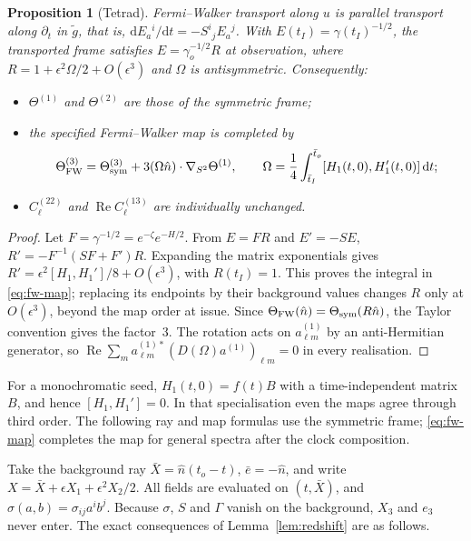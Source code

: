 \documentclass[11pt]{article}
\newtheorem{proposition}[theorem]{Proposition}
\theoremstyle{definition}
\theoremstyle{remark}
\newcommand{\eps}{\epsilon}
\newcommand{\nh}{\hat n}
\newcommand{\dd}{\mathrm{d}}
\begin{document}
\begin{proposition}[Tetrad]\label{prop:frame}
Fermi--Walker transport along $u$ is parallel transport along $\partial_t$ in $\tilde g$, that
is, $\dd E_a{}^i/\dd t=-S^i{}_jE_a{}^j$. With $E(t_I)=\gamma(t_I)^{-1/2}$, the transported frame
satisfies $E=\gamma_o^{-1/2}R$ at observation, where $R=1+\eps^2\Omega/2+O(\eps^3)$ and $\Omega$
is antisymmetric. Consequently:
\begin{itemize}
\item $\Theta^{(1)}$ and $\Theta^{(2)}$ are those of the symmetric frame;
\item the specified Fermi--Walker map is completed by
  \begin{equation}\label{eq:fw-map}
  \Theta_{\rm FW}^{(3)}=\Theta_{\rm sym}^{(3)}
  +3(\Omega\nh)\cdot\nabla_{S^2}\Theta^{(1)},\qquad
  \Omega=\frac14\int_{\bar t_I}^{\bar t_o}[H_1(t,0),H_1'(t,0)]\,\dd t;
  \end{equation}
\item $C_\ell^{(22)}$ and $\operatorname{Re}C_\ell^{(13)}$ are individually unchanged.
\end{itemize}
\end{proposition}
\begin{proof}
Let $F=\gamma^{-1/2}=e^{-\zeta}e^{-H/2}$. From $E=FR$ and $E'=-SE$,
$R'=-F^{-1}(SF+F')R$. Expanding the matrix exponentials gives
$R'=\eps^2[H_1,H_1']/8+O(\eps^3)$, with $R(t_I)=1$. This proves the integral in
\eqref{eq:fw-map}; replacing its endpoints by their background values changes $R$ only at
$O(\eps^3)$, beyond the map order at issue. Since
$\Theta_{\rm FW}(\nh)=\Theta_{\rm sym}(R\nh)$, the Taylor convention gives the factor~3.
The rotation acts on $a^{(1)}_{\ell m}$ by an anti-Hermitian generator, so
$\operatorname{Re}\sum_ma^{(1)*}_{\ell m}(D(\Omega)a^{(1)})_{\ell m}=0$ in every realisation.
\end{proof}

For a monochromatic seed, $H_1(t,0)=f(t)B$ with a time-independent matrix $B$, and hence
$[H_1,H_1']=0$. In that specialisation even the maps agree through third order.
The following ray and map formulas use the symmetric frame; \eqref{eq:fw-map} completes the
map for general spectra after the clock composition.

Take the background ray $\bar X=\nh(t_o-t)$, $\bar e=-\nh$, and write $X=\bar X+\eps X_1+\eps^2X_2/2$.
All fields are evaluated on $(t,\bar X)$, and $\sigma(a,b)=\sigma_{ij}a^ib^j$. Because $\sigma$,
$S$ and $\Gamma$ vanish on the background, $X_3$ and $e_3$ never enter. The exact consequences of
Lemma~\ref{lem:redshift} are as follows.
\end{document}
